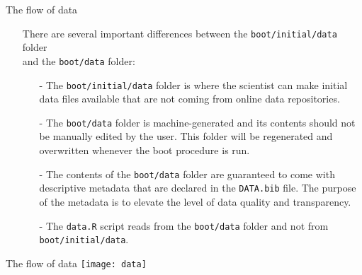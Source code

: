 \documentclass[aspectratio=169]{beamer}
\begin{document}
\begin{frame}{The flow of data}\small
  \begin{itemize}
    \item[] There are several important differences between the
    {\tt boot/initial/data} folder\\[0.2ex]
    and the {\tt boot/data} folder:\\[1ex]
    \begin{itemize}
      \item[-] The {\tt\green boot/initial/data} folder is where the scientist
      can make initial\\
      data files available that are not coming from online data
      repositories.\\[2ex]
      \item[-] The {\tt\orange boot/data} folder is machine-generated and its
      contents should not\\
      be manually edited by the user. This folder will be regenerated and\\
      overwritten whenever the boot procedure is run.\\[2ex]
      \item[-] The contents of the {\tt\orange boot/data} folder are guaranteed
      to come with\\
      descriptive metadata that are declared in the {\tt DATA.bib} file. The
      purpose\\ of the metadata is to elevate the level of data quality and
      transparency.\\[2ex]
      \item[-] The {\tt data.R} script reads from the {\tt\orange boot/data}
      folder and not from {\tt\green boot/initial/data}.\\[4ex]
    \end{itemize}
  \end{itemize}
\end{frame}


\begin{frame}{The flow of data}\small
  \vspace{1ex}
  \qquad\texttt{[image: data]}
\end{frame}

\end{document}
